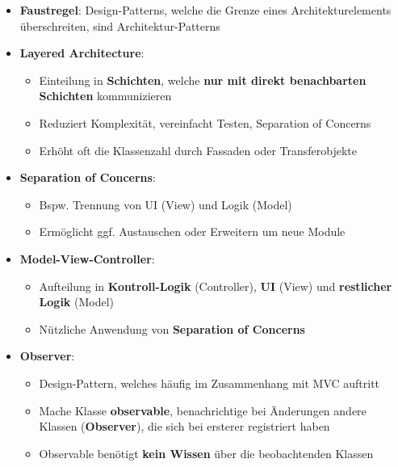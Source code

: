 \begin{itemize}
	\item \textbf{Faustregel}: Design-Patterns, welche die Grenze eines Architekturelements überschreiten, sind Architektur-Patterns
	\item \textbf{Layered Architecture}:
	\begin{itemize}
		\item Einteilung in \textbf{Schichten}, welche \textbf{nur mit direkt benachbarten Schichten} kommunizieren
		\item Reduziert Komplexität, vereinfacht Testen, Separation of Concerns
		\item Erhöht oft die Klassenzahl durch Fassaden oder Transferobjekte
	\end{itemize}
	\item \textbf{Separation of Concerns}:
	\begin{itemize}
		\item Bspw. Trennung von UI (View) und Logik (Model)
		\item Ermöglicht ggf. Austauschen oder Erweitern um neue Module
	\end{itemize}
	\item \textbf{Model-View-Controller}:
	\begin{itemize}
		\item Aufteilung in \textbf{Kontroll-Logik} (Controller), \textbf{UI} (View) und \textbf{restlicher Logik} (Model)
		\item Nützliche Anwendung von \textbf{Separation of Concerns}
	\end{itemize}
	\item \textbf{Observer}:
	\begin{itemize}
		\item Design-Pattern, welches häufig im Zusammenhang mit MVC auftritt
		\item Mache Klasse \textbf{observable}, benachrichtige bei Änderungen andere Klassen (\textbf{Observer}), die sich bei ersterer registriert haben
		\item Observable benötigt \textbf{kein Wissen} über die beobachtenden Klassen
	\end{itemize}
\end{itemize}